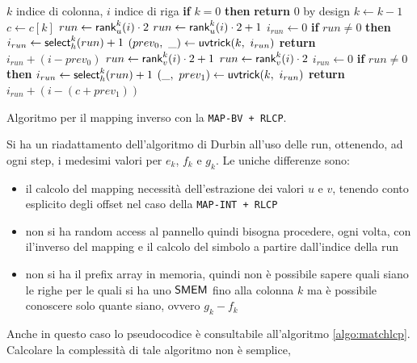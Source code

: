 \begin{algorithm}
  \begin{algorithmic}[1]
    \Comment $k$ indice di colonna, $i$ indice di riga
    \State \textbf{if} $k=0$ \textbf{then} \textbf{return} $0$
    \Comment by design
    \State $k\gets k-1$
    \State $c\gets c[k]$
    \State $run\gets \mbox{\rm {\sf rank}}_u^{k}(i)\cdot 2$
    \Else
    \State $run\gets \mbox{\rm {\sf rank}}_u^{k}(i)\cdot 2+1$
    \EndIf
    \State $i_{run}\gets 0$
    \State \textbf{if} $run\neq 0$ \textbf{then} $i_{run}\gets
    \mbox{\rm {\sf select}}_h^{k}(run)+1$ 
    \State $(prev_0,\,\,\_)\gets \mbox{\rm {\sf uvtrick}}(k,\,\,i_{run})$
    \State \textbf{return} $i_{run}+(i-prev_0)$
    \Else
    \State $run\gets \mbox{\rm {\sf rank}}_v^{k}(i)\cdot 2+1$
    \Else
    \State $run\gets \mbox{\rm {\sf rank}}_v^{k}(i)\cdot 2$
    \EndIf
    \State $i_{run}\gets 0$
    \State \textbf{if} $run\neq 0$ \textbf{then} $i_{run}\gets
    \mbox{\rm {\sf select}}_h^{k}(run)+1$ 
    \State $(\_,\,\,prev_1)\gets \mbox{\rm {\sf uvtrick}}(k,\,\,i_{run})$
    \State \textbf{return} $i_{run}+(i-(c+prev_1))$
    \EndIf
    \EndFunction
  \end{algorithmic}
  \caption{Algoritmo per il mapping inverso con la \texttt{MAP-BV + RLCP}.}
  \label{algo:lfrevbv}
\end{algorithm}
Si ha un riadattamento dell'algoritmo di Durbin all'uso delle run,
ottenendo, ad ogni step, i medesimi valori per $e_k$, $f_k$ e $g_k$. Le uniche
differenze sono:
\begin{itemize}
  \item il calcolo del mapping necessità dell'estrazione dei valori $u$ e $v$,
  tenendo conto esplicito degli offset nel caso della \texttt{MAP-INT + RLCP}
  \item non si ha random access al pannello quindi bisogna procedere,
  ogni volta, con il'inverso del mapping e il calcolo del simbolo a partire
  dall'indice della run
  \item non si ha il prefix array in memoria, quindi non è possibile
  sapere quali siano le righe per le quali si ha uno $\mbox{\rm {\sf SMEM}}$ fino alla colonna
  $k$ ma è possibile conoscere solo quante siano, ovvero $g_k-f_k$
\end{itemize}
Anche in questo caso lo pseudocodice è consultabile all'algoritmo
\ref{algo:matchlcp}. Calcolare la complessità di tale algoritmo non è semplice,
